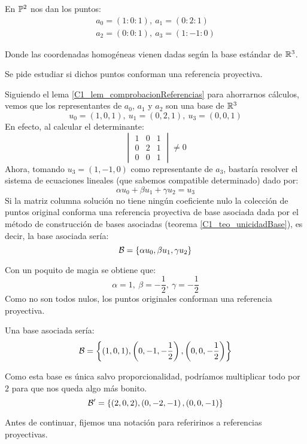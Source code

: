 \begin{exa}
	\label{C1_exa_basesAsociadas}
	En $\mathbb{P}^2$ nos dan los puntos: \begin{gather*}a_0=(1:0:1),\ a_1=(0:2:1)\\a_2=(0:0:1),\ a_3=(1:-1:0)
	\end{gather*}
	
	Donde las coordenadas homogéneas vienen dadas según la base estándar de $\mathbb{R}^3$.
	
	Se pide estudiar si dichos puntos conforman una referencia proyectiva.
	
	Siguiendo el lema \ref{C1_lem_comprobacionReferencias} para ahorrarnos cálculos, vemos que los representantes de $a_0$, $a_1$ y $a_2$ son una base de $\mathbb{R}^3$
		\begin{equation*}
		u_0=(1,0,1),\ u_1=(0,2,1),\ u_3=(0,0,1)
		\end{equation*}
	En efecto, al calcular el determinante:
	\[\begin{vmatrix}
	1 & 0 & 1\\
	0 & 2 & 1\\
	0 & 0 & 1
	\end{vmatrix}\not= 0\]
	Ahora, tomando $u_3=(1,-1,0)$ como representante de $a_3$, bastaría resolver el sistema de ecuaciones lineales (que sabemos compatible determinado) dado por:
	\[\alpha u_0+\beta u_1 + \gamma u_2 = u_3\]
	Si la matriz columna solución no tiene ningún coeficiente nulo la colección de puntos original conforma una referencia proyectiva de base asociada dada por el método de construcción de bases asociadas (teorema \ref{C1_teo_unicidadBase}), es decir, la base asociada sería:\[\mathcal{B}=\{\alpha u_0,\beta u_1, \gamma u_2\}\]
	
	Con un poquito de magia se obtiene que:\[\alpha = 1,\ \beta = -\frac{1}{2},\ \gamma = -\frac{1}{2}\]
	Como no son todos nulos, los puntos originales conforman una referencia proyectiva.
	
	Una base asociada sería:
	\[
	\mathcal{B}=\left\{(1,0,1), \left(0,-1,-\frac{1}{2}\right),\left(0,0,-\frac{1}{2}\right)\right\}
	\]
	
	Como esta base es única salvo proporcionalidad, podríamos multiplicar todo por $2$ para que nos queda algo más bonito.
	\[
	\mathcal{B}'=\left\{(2,0,2), \left(0,-2,-1\right),\left(0,0,-1\right)\right\}
	\]
\end{exa}
Antes de continuar, fijemos una notación para referirinos a referencias proyectivas.

